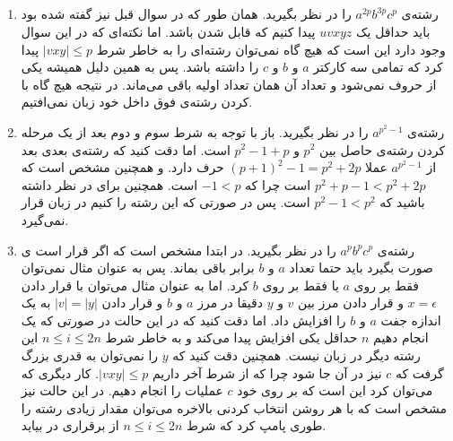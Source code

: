 \subsection{}
\begin{enumerate}
    \item رشته‌ی
    $a^{2p}b^{3p}c^p$
    را در نظر بگیرید. همان طور که در سوال قبل نیز گفته شده بود باید حداقل یک
    $uvxyz$
    پیدا کنیم که قابل
    شدن باشد. اما نکته‌ای که در این سوال وجود دارد این است که هیچ گاه نمی‌توان رشته‌ای را به خاطر شرط
    $|vxy| \le p$
    پیدا کرد که تمامی سه کارکتر
    $a$ و $b$ و $c$
    را داشته باشد. پس به همین دلیل همیشه یکی از حروف
    نمی‌شود و تعداد آن همان تعداد اولیه باقی می‌ماند. در نتیجه هیچ گاه با
    کردن رشته‌ی فوق داخل خود زبان نمی‌افتیم.
    \item رشته‌ی
    $a^{p^2-1}$
    را در نظر بگیرید. باز با توجه به شرط سوم و دوم بعد از یک مرحله
    کردن رشته‌ی حاصل بین
    $p^2$ و $p^2-1+p$
    است. اما دقت کنید که رشته‌ی بعدی بعد از
    $a^{p^2-1}$
    عملا
    $(p+1)^2-1 = p^2+2p$
    حرف دارد. و همچنین مشخص است که
    $p^2+p-1 < p^2+2p$
    است چرا که
    $-1 < p$
    است. همچنین برای
    در نظر داشته باشید که
    $p^2-1 < p^2$
    است. پس در صورتی که این رشته را
    کنیم در زبان قرار نمی‌گیرد.
    \item رشته‌ی
    $a^pb^pc^p$
    را در نظر بگیرید. در ابتدا مشخص است که اگر قرار است
    ی
    صورت بگیرد باید حتما تعداد
    $a$ و $b$
    برابر باقی بماند. پس به عنوان مثال نمی‌توان فقط بر روی
    $a$ یا فقط بر روی $b$
    کرد. اما به عنوان مثال می‌توان با قرار دادن
    $x = \epsilon$
    و قرار دادن مرز بین
    $v$ و $y$
    دقیقا در مرز
    $a$ و $b$
    و قرار دادن
    $|v| = |y|$
    به یک اندازه جفت
    $a$ و $b$
    را افزایش داد. اما دقت کنید که در این حالت در صورتی که یک
    انجام دهیم
    $n$
    حداقل یکی افزایش پیدا می‌کند و به خاطر شرط
    $n \le i \le 2n$
    این رشته دیگر در زبان نیست. همچنین دقت کنید که
    $y$
    را نمی‌توان به قدری بزرگ گرفت که
    $c$
    نیز در آن جا شود چرا که از شرط آخر داریم
    $|vxy| \le p$.
    کار دیگری که می‌توان کرد این است که بر روی خود
    $c$
    عملیات
    را انجام دهیم. در این حالت نیز مشخص است که با هر روشن انتخاب کردنی بالاخره می‌توان مقدار زیادی
    رشته را طوری پامپ کرد که شرط
    $n \le i \le 2n$
    از برقراری در بیاید.
\end{enumerate}